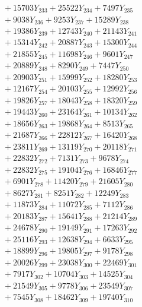 \documentclass[a4paper,10pt]{article}
\begin{document}
{\begin{align}
&\;  + 15703 Y_{233} + 25522 Y_{234} + 7497 Y_{235} \\[0.3ex]
&\;  + 9038 Y_{236} + 9253 Y_{237} + 15289 Y_{238} \\[0.5ex]\allowbreak
&\;  + 19386 Y_{239} + 12743 Y_{240} + 21143 Y_{241} \\[0.3ex]
&\;  + 15314 Y_{242} + 20887 Y_{243} + 15300 Y_{244} \\[0.3ex]
&\;  + 21855 Y_{245} + 11698 Y_{246} + 9601 Y_{247} \\[0.3ex]
&\;  + 20889 Y_{248} + 8290 Y_{249} + 7447 Y_{250} \\[0.3ex]
&\;  + 20903 Y_{251} + 15999 Y_{252} + 18280 Y_{253} \\[0.3ex]
&\;  + 12167 Y_{254} + 20103 Y_{255} + 12992 Y_{256} \\[0.3ex]
&\;  + 19826 Y_{257} + 18043 Y_{258} + 18320 Y_{259} \\[0.3ex]
&\;  + 19443 Y_{260} + 23164 Y_{261} + 10134 Y_{262} \\[0.3ex]
&\;  + 18656 Y_{263} + 19868 Y_{264} + 8513 Y_{265} \\[0.3ex]
&\;  + 21687 Y_{266} + 22812 Y_{267} + 16420 Y_{268} \\[0.5ex]\allowbreak
&\;  + 23811 Y_{269} + 13119 Y_{270} + 20118 Y_{271} \\[0.3ex]
&\;  + 22832 Y_{272} + 7131 Y_{273} + 9678 Y_{274} \\[0.3ex]
&\;  + 22832 Y_{275} + 19104 Y_{276} + 16846 Y_{277} \\[0.3ex]
&\;  + 6901 Y_{278} + 11420 Y_{279} + 21605 Y_{280} \\[0.3ex]
&\;  + 8627 Y_{281} + 8251 Y_{282} + 12249 Y_{283} \\[0.3ex]
&\;  + 11873 Y_{284} + 11072 Y_{285} + 7112 Y_{286} \\[0.3ex]
&\;  + 20183 Y_{287} + 15641 Y_{288} + 21214 Y_{289} \\[0.3ex]
&\;  + 24678 Y_{290} + 19149 Y_{291} + 17263 Y_{292} \\[0.3ex]
&\;  + 25116 Y_{293} + 12638 Y_{294} + 6633 Y_{295} \\[0.3ex]
&\;  + 18899 Y_{296} + 19805 Y_{297} + 9178 Y_{298} \\[0.5ex]\allowbreak
&\;  + 20026 Y_{299} + 23038 Y_{300} + 22469 Y_{301} \\[0.3ex]
&\;  + 7917 Y_{302} + 10704 Y_{303} + 14525 Y_{304} \\[0.3ex]
&\;  + 21549 Y_{305} + 9778 Y_{306} + 23549 Y_{307} \\[0.3ex]
&\;  + 7545 Y_{308} + 18462 Y_{309} + 19740 Y_{310} \\[0.3ex]

\end{align}}
\end{document}
